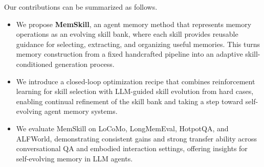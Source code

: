 Our contributions can be summarized as follows.
\begin{itemize}
\item We propose \textbf{MemSkill}, an agent memory method that represents memory operations as an evolving skill bank, where each skill provides reusable guidance for selecting, extracting, and organizing useful memories. This turns memory construction from a fixed handcrafted pipeline into an adaptive skill-conditioned generation process.
\item We introduce a closed-loop optimization recipe that combines reinforcement learning for skill selection with LLM-guided skill evolution from hard cases, enabling continual refinement of the skill bank and taking a step toward self-evolving agent memory systems.
\item We evaluate MemSkill on LoCoMo, LongMemEval, HotpotQA, and ALFWorld, demonstrating consistent gains and strong transfer ability across conversational QA and embodied interaction settings, offering insights for self-evolving memory in LLM agents.
\end{itemize}





